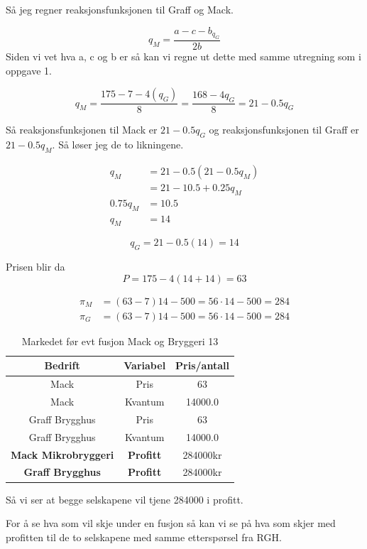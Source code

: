 \documentclass[
  12pt,
  a4paper,
  DIV=11,
  numbers=noendperiod]{scrartcl}
\begin{document}
Så jeg regner reaksjonsfunksjonen til Graff og Mack.

\[
q_M = \frac{a-c-b_{q_G}}{2b}
\] Siden vi vet hva a, c og b er så kan vi regne ut dette med samme
utregning som i oppgave 1.

\[
q_M = \frac{175-7-4(q_G)}{8} = \frac{168-4q_G}{8} = 21-0.5q_G
\]

Så reaksjonsfunksjonen til Mack er \(21-0.5q_G\) og reaksjonsfunksjonen
til Graff er \(21-0.5q_M\). Så løser jeg de to likningene.

\begin{align*}
q_M &= 21-0.5(21-0.5q_M) \\
&= 21-10.5+0.25q_M \\
0.75q_M &= 10.5 \\
q_M &= 14
\end{align*}

\[
q_G = 21-0.5(14) = 14
\]

Prisen blir da \[
P = 175-4(14+14) = 63
\]

\begin{align*}
\pi_M &= (63-7)14 - 500 = 56 \cdot 14 - 500 = 284 \\
\pi_G &= (63-7)14 - 500 = 56 \cdot 14 - 500 = 284
\end{align*}

\begin{table}[h]
\centering
\begin{tabular}{|c|c|c|}
\hline
\textbf{Bedrift} & \textbf{Variabel} & \textbf{Pris/antall} \\
\hline
Mack & Pris & 63 \\
Mack & Kvantum & 14000.0 \\
Graff Brygghus & Pris & 63 \\
Graff Brygghus & Kvantum & 14000.0 \\
\rowcolor{lighterblue} \textbf{Mack Mikrobryggeri} & \textbf{Profitt} & 284000kr \\ \hline
\rowcolor{lighterblue} \textbf{Graff Brygghus} & \textbf{Profitt} & 284000kr \\ \hline
\end{tabular}
\caption{Markedet før evt fusjon Mack og Bryggeri 13}
\label{table:4}
\end{table}

Så vi ser at begge selskapene vil tjene 284000 i profitt.

For å se hva som vil skje under en fusjon så kan vi se på hva som skjer
med profitten til de to selskapene med samme etterspørsel fra RGH.
\end{document}
